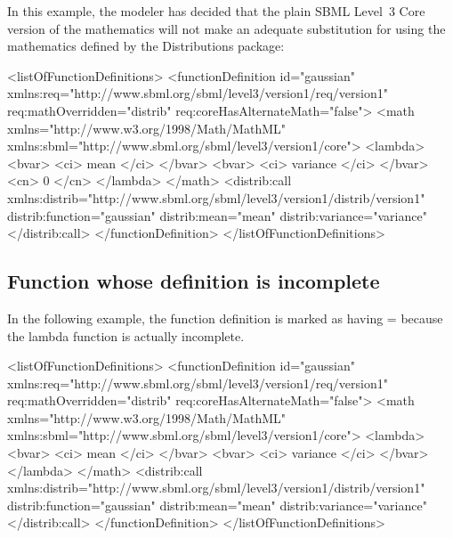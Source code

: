 In this example, the modeler has decided that the plain SBML Level~3 Core version of the mathematics will not make an adequate substitution for using the mathematics defined by the Distributions package:

\begin{example}
<listOfFunctionDefinitions> 
    <functionDefinition id="gaussian" 
                        xmlns:req="http://www.sbml.org/sbml/level3/version1/req/version1"
                        req:mathOverridden="distrib" req:coreHasAlternateMath="false"> 
        <math xmlns="http://www.w3.org/1998/Math/MathML" 
              xmlns:sbml="http://www.sbml.org/sbml/level3/version1/core"> 
             <lambda>
                 <bvar> <ci> mean </ci> </bvar>
                 <bvar> <ci> variance </ci> </bvar>
                 <cn> 0 </cn>
             </lambda>
        </math> 
        <distrib:call xmlns:distrib="http://www.sbml.org/sbml/level3/version1/distrib/version1"    
                      distrib:function="gaussian" distrib:mean="mean" distrib:variance="variance"
        </distrib:call> 
    </functionDefinition> 
</listOfFunctionDefinitions> 
\end{example} 


\subsection{Function whose definition is incomplete}

In the following example, the function definition is marked as having = because the lambda function is actually incomplete.

\begin{example}
<listOfFunctionDefinitions> 
    <functionDefinition id="gaussian" 
                        xmlns:req="http://www.sbml.org/sbml/level3/version1/req/version1"
                        req:mathOverridden="distrib" req:coreHasAlternateMath="false"> 
        <math xmlns="http://www.w3.org/1998/Math/MathML" 
              xmlns:sbml="http://www.sbml.org/sbml/level3/version1/core"> 
             <lambda>
                 <bvar> <ci> mean </ci> </bvar>
                 <bvar> <ci> variance </ci> </bvar>
             </lambda>
        </math> 
        <distrib:call xmlns:distrib="http://www.sbml.org/sbml/level3/version1/distrib/version1"    
                      distrib:function="gaussian" distrib:mean="mean" distrib:variance="variance"
        </distrib:call> 
    </functionDefinition> 
</listOfFunctionDefinitions> 
\end{example}
